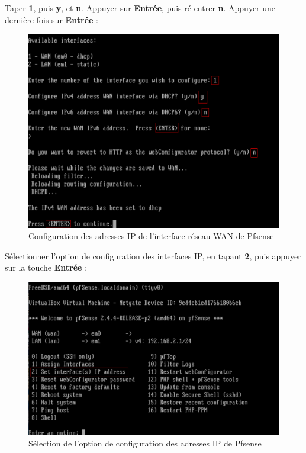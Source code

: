 \newpage
Taper \textbf{1}, puis \textbf{y}, et \textbf{n}. Appuyer sur \textbf{Entrée}, puis ré-entrer \textbf{n}. Appuyer une dernière fois sur \textbf{Entrée} :
\begin{figure}[h!]
	\begin{center}
		\includegraphics[scale=0.5]{Pfsense_Screeshots/16.png}
		\caption{Configuration des adresses IP de l'interface réseau WAN de Pfsense}
		\label{Pfsense_Screeshots/16}
	\end{center}
\end{figure}
\FloatBarrier

\newpage
Sélectionner l'option de configuration des interfaces IP, en tapant \textbf{2}, puis appuyer sur la touche \textbf{Entrée} :
\begin{figure}[h!]
	\begin{center}
		\includegraphics[scale=0.5]{Pfsense_Screeshots/15.png}
		\caption{Sélection de l'option de configuration des adresses IP de Pfsense}
		\label{Pfsense_Screeshots/15}
	\end{center}
\end{figure}
\FloatBarrier

